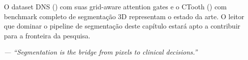 O dataset DNS () com suas grid-aware attention gates
e o CTooth () com benchmark completo de segmentação 3D
representam o estado da arte. O leitor que dominar o pipeline de segmentação
deste capítulo estará apto a contribuir para a fronteira da pesquisa.

\begin{flushright}
\itshape\small
--- ``Segmentation is the bridge from pixels to clinical decisions.''
\end{flushright}

